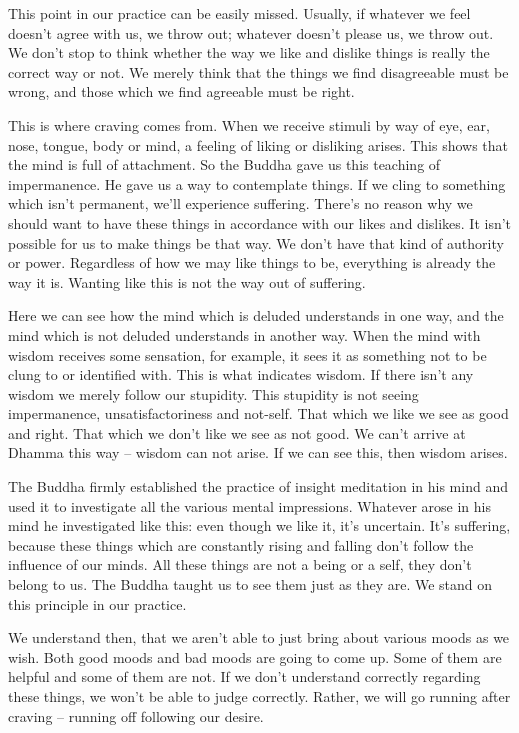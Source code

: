 This point in our practice can be easily missed. Usually, if whatever we feel doesn't agree with us, we throw out; whatever doesn't please us, we throw out. We don't stop to think whether the way we like and dislike things is really the correct way or not. We merely think that the things we find disagreeable must be wrong, and those which we find agreeable must be right. 

This is where craving comes from. When we receive stimuli by way of eye, ear, nose, tongue, body or mind, a feeling of liking or disliking arises. This shows that the mind is full of attachment. So the Buddha gave us this teaching of impermanence. He gave us a way to contemplate things. If we cling to something which isn't permanent, we'll experience suffering. There's no reason why we should want to have these things in accordance with our likes and dislikes. It isn't possible for us to make things be that way. We don't have that kind of authority or power. Regardless of how we may like things to be, everything is already the way it is. Wanting like this is not the way out of suffering. 

Here we can see how the mind which is deluded understands in one way, and the mind which is not deluded understands in another way. When the mind with wisdom receives some sensation, for example, it sees it as something not to be clung to or identified with. This is what indicates wisdom. If there isn't any wisdom we merely follow our stupidity. This stupidity is not seeing impermanence, unsatisfactoriness and not-self. That which we like we see as good and right. That which we don't like we see as not good. We can't arrive at Dhamma this way -- wisdom can not arise. If we can see this, then wisdom arises. 

The Buddha firmly established the practice of insight meditation in his mind and used it to investigate all the various mental impressions. Whatever arose in his mind he investigated like this: even though we like it, it's uncertain. It's suffering, because these things which are constantly rising and falling don't follow the influence of our minds. All these things are not a being or a self, they don't belong to us. The Buddha taught us to see them just as they are. We stand on this principle in our practice. 

We understand then, that we aren't able to just bring about various moods as we wish. Both good moods and bad moods are going to come up. Some of them are helpful and some of them are not. If we don't understand correctly regarding these things, we won't be able to judge correctly. Rather, we will go running after craving -- running off following our desire. 

